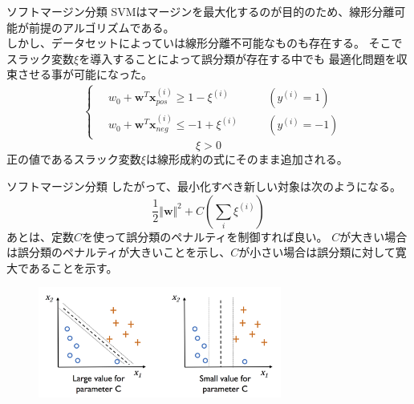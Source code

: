 \documentclass[aspectratio=169, dvipdfmx, 11pt]{beamer} %
\begin{document}
\begin{frame}{ソフトマージン分類}
    SVMはマージンを最大化するのが目的のため、線形分離可能が前提のアルゴリズムである。\\
    しかし、データセットによっていは線形分離不可能なものも存在する。
    そこでスラック変数\(\xi\)を導入することによって誤分類が存在する中でも
    最適化問題を収束させる事が可能になった。
    \begin{equation*}
        \begin{aligned}
            & \left\{ \,
                \begin{aligned}
                    & w_0 + \bm{w}^T \bm{x}_{pos}^{(i)} \geq  1 - \xi^{(i)} & \quad &(y^{(i)} = 1)\\
                    & w_0 + \bm{w}^T \bm{x}_{neg}^{(i)} \leq  -1 + \xi^{(i)} & \quad &(y^{(i)} = -1)
                \end{aligned}
            \right.
        \end{aligned}
    \end{equation*}
    \begin{equation*}
        \xi > 0
    \end{equation*}
    正の値であるスラック変数\(\xi\)は線形成約の式にそのまま追加される。
\end{frame}

\begin{frame}{ソフトマージン分類}
    したがって、最小化すべき新しい対象は次のようになる。
    \begin{equation*}
        \frac{1}{2}\Vert\bm{w}\Vert^2 + C(\sum_{i}^{}\xi^{(i)})
    \end{equation*}
    あとは、定数\(C\)を使って誤分類のペナルティを制御すれば良い。
    \(C\)が大きい場合は誤分類のペナルティが大きいことを示し、\(C\)が小さい場合は誤分類に対して寛大であることを示す。
    \begin{figure}[b]
        \begin{center}
        \includegraphics[width=80mm]{img/day02/fig06.png}
        \end{center}
    \end{figure}
\end{frame}
\end{document}
